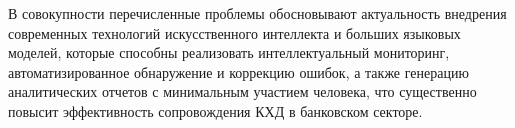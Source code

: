 В совокупности перечисленные проблемы обосновывают актуальность внедрения современных технологий искусственного интеллекта и больших языковых моделей, которые способны реализовать интеллектуальный мониторинг, автоматизированное обнаружение и коррекцию ошибок, а также генерацию аналитических отчетов с минимальным участием человека, что существенно повысит эффективность сопровождения КХД в банковском секторе.











 



